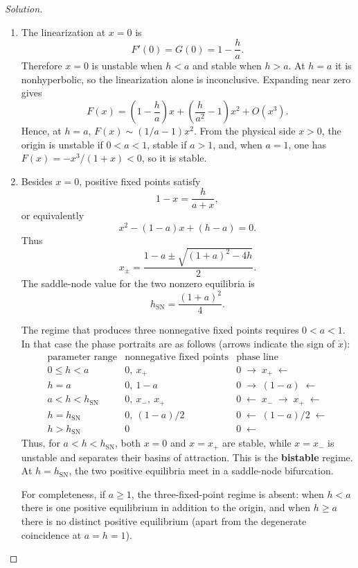 \documentclass[12pt]{amsart}
\theoremstyle{conjecture}
\theoremstyle{definition}
\theoremstyle{question}
\theoremstyle{theorem}
\newenvironment{solution}
{\begin{proof}[Solution]}
{\end{proof}}
\begin{document}
\begin{enumerate}
\begin{solution}
            \begin{enumerate}[label=(\alph*)]
    \item The linearization at $x=0$ is
    \[
        F'(0)=G(0)=1-\frac{h}{a}.
    \]
    Therefore $x=0$ is unstable when $h<a$ and stable when $h>a$. At $h=a$ it is
    nonhyperbolic, so the linearization alone is inconclusive. Expanding near zero gives
    \[
        F(x)=\left(1-\frac{h}{a}\right)x
        +\left(\frac{h}{a^2}-1\right)x^2+O(x^3).
    \]
    Hence, at $h=a$, $F(x)\sim(1/a-1)x^2$. From the physical side $x>0$, the origin is
    unstable if $0<a<1$, stable if $a>1$, and, when $a=1$, one has
    $F(x)=-x^3/(1+x)<0$, so it is stable.

    \item Besides $x=0$, positive fixed points satisfy
    \[
        1-x=\frac{h}{a+x},
    \]
    or equivalently
    \[
        x^2-(1-a)x+(h-a)=0.
    \]
    Thus
    \[
        x_{\pm}=\frac{1-a\pm\sqrt{(1+a)^2-4h}}{2}.
    \]
    The saddle-node value for the two nonzero equilibria is
    \[
        h_{\mathrm{SN}}=\frac{(1+a)^2}{4}.
    \]

    The regime that produces three nonnegative fixed points requires $0<a<1$. In that case the
    phase portraits are as follows (arrows indicate the sign of $\dot{x}$):
    \[
        \begin{array}{c|c|c}
            \text{parameter range} & \text{nonnegative fixed points} & \text{phase line}\\
            \hline
            0\le h<a & 0,\ x_+ & 0\;\longrightarrow\;x_+\;\longleftarrow\\[2pt]
            h=a & 0,\ 1-a & 0\;\longrightarrow\;(1-a)\;\longleftarrow\\[2pt]
            a<h<h_{\mathrm{SN}} & 0,\ x_-,\ x_+ &
            0\;\longleftarrow\;x_-\;\longrightarrow\;x_+\;\longleftarrow\\[2pt]
            h=h_{\mathrm{SN}} & 0,\ (1-a)/2 &
            0\;\longleftarrow\;(1-a)/2\;\longleftarrow\\[2pt]
            h>h_{\mathrm{SN}} & 0 & 0\;\longleftarrow
        \end{array}
    \]
    Thus, for $a<h<h_{\mathrm{SN}}$, both $x=0$ and $x=x_+$ are stable, while $x=x_-$ is
    unstable and separates their basins of attraction. This is the \textbf{bistable} regime.
    At $h=h_{\mathrm{SN}}$, the two positive equilibria meet in a saddle-node bifurcation.

    For completeness, if $a\ge1$, the three-fixed-point regime is absent: when $h<a$ there is one
    positive equilibrium in addition to the origin, and when $h\ge a$ there is no distinct positive
    equilibrium (apart from the degenerate coincidence at $a=h=1$).


\end{enumerate}
\end{solution}
\end{enumerate}
\end{document}
